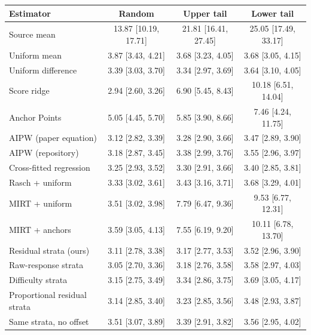 \begin{tabular}{lccc}
\toprule
Estimator & Random & Upper tail & Lower tail \\
\midrule
Source mean & 13.87 [10.19, 17.71] & 21.81 [16.41, 27.45] & 25.05 [17.49, 33.17] \\
Uniform mean & 3.87 [3.43, 4.21] & 3.68 [3.23, 4.05] & 3.68 [3.05, 4.15] \\
Uniform difference & 3.39 [3.03, 3.70] & 3.34 [2.97, 3.69] & 3.64 [3.10, 4.05] \\
Score ridge & 2.94 [2.60, 3.26] & 6.90 [5.45, 8.43] & 10.18 [6.51, 14.04] \\
Anchor Points & 5.05 [4.45, 5.70] & 5.85 [3.90, 8.66] & 7.46 [4.24, 11.75] \\
AIPW (paper equation) & 3.12 [2.82, 3.39] & 3.28 [2.90, 3.66] & 3.47 [2.89, 3.90] \\
AIPW (repository) & 3.18 [2.87, 3.45] & 3.38 [2.99, 3.76] & 3.55 [2.96, 3.97] \\
Cross-fitted regression & 3.25 [2.93, 3.52] & 3.30 [2.91, 3.66] & 3.40 [2.85, 3.81] \\
Rasch + uniform & 3.33 [3.02, 3.61] & 3.43 [3.16, 3.71] & 3.68 [3.29, 4.01] \\
MIRT + uniform & 3.51 [3.02, 3.98] & 7.79 [6.47, 9.36] & 9.53 [6.77, 12.31] \\
MIRT + anchors & 3.59 [3.05, 4.13] & 7.55 [6.19, 9.20] & 10.11 [6.78, 13.70] \\
Residual strata (ours) & 3.11 [2.78, 3.38] & 3.17 [2.77, 3.53] & 3.52 [2.96, 3.90] \\
Raw-response strata & 3.05 [2.70, 3.36] & 3.18 [2.76, 3.58] & 3.58 [2.97, 4.03] \\
Difficulty strata & 3.15 [2.75, 3.49] & 3.34 [2.86, 3.75] & 3.69 [3.05, 4.17] \\
Proportional residual strata & 3.14 [2.85, 3.40] & 3.23 [2.85, 3.56] & 3.48 [2.93, 3.87] \\
Same strata, no offset & 3.51 [3.07, 3.89] & 3.39 [2.91, 3.82] & 3.56 [2.95, 4.02] \\
\bottomrule
\end{tabular}
